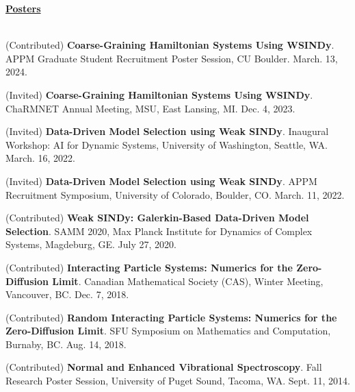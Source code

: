 \documentclass[letterpaper,11pt,oneside]{article}
\newcommand{\headr}[1]{\vspace{10pt}\uline{\Large{\textbf{#1}} \hfill } \\ \vspace{-10pt}\\}
\begin{document}
\headr{Posters} 
\vspace{-0.5cm}
\begin{enumerate}[label={[\arabic*]}]
\item (Contributed) \textbf{Coarse-Graining Hamiltonian Systems Using WSINDy}. APPM Graduate Student Recruitment Poster Session, CU Boulder. March. 13, 2024.
\item (Invited) \textbf{Coarse-Graining Hamiltonian Systems Using WSINDy}. ChaRMNET Annual Meeting, MSU, East Lansing, MI. Dec. 4, 2023.
\item (Invited) \textbf{Data-Driven Model Selection using Weak SINDy}. Inaugural Workshop: AI for Dynamic Systems, University of Washington, Seattle, WA. March. 16, 2022.
\item (Invited) \textbf{Data-Driven Model Selection using Weak SINDy}. APPM Recruitment Symposium, University of Colorado, Boulder, CO. March. 11, 2022.
\item (Contributed) \textbf{Weak SINDy: Galerkin-Based Data-Driven Model Selection}. SAMM 2020, Max Planck Institute for Dynamics of Complex Systems, Magdeburg, GE. July 27, 2020.
\item (Contributed) \textbf{Interacting Particle Systems: Numerics for the Zero-Diffusion Limit}. Canadian Mathematical Society (CAS), Winter Meeting, Vancouver, BC. Dec. 7, 2018.
\item (Contributed) \textbf{Random Interacting Particle Systems: Numerics for the Zero-Diffusion Limit}. SFU Symposium on Mathematics and Computation, Burnaby, BC. Aug. 14, 2018.
\item (Contributed) \textbf{Normal and Enhanced Vibrational Spectroscopy}. Fall Research Poster Session, University of Puget Sound, Tacoma, WA. Sept. 11, 2014.
\end{enumerate}
\end{document}
